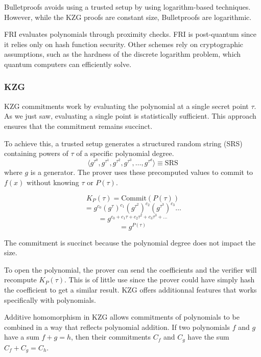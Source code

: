 Bulletproofs avoids using a trusted setup by using logarithm-based techniques\cite{BP18}. 
However, while the KZG proofs are constant size, Bulletproofs are logarithmic.

FRI evaluates polynomials through proximity checks.\cite{FRI} FRI is post-quantum since it relies only on hash function security. 
Other schemes rely on cryptographic assumptions, such as the hardness of the discrete logarithm problem, which quantum computers can efficiently solve.


\subsubsection{KZG}
KZG commitments work by evaluating the polynomial at a single secret point $\tau$. 
As we just saw, evaluating a single point is statistically sufficient.
This approach ensures that the commitment remains succinct.

To achieve this, a trusted setup generates a structured random string (SRS) containing powers of $\tau$
of a specific polynomial degree. 
\[
\langle g^{\tau^0}, g^{\tau^1}, g^{\tau^2}, g^{\tau^3}, \dots, g^{\tau^d} \rangle \equiv \text{SRS}
\]
where \( g \) is a generator.  
The prover uses these precomputed values to commit to \( f(x) \) without knowing \( \tau \) or \( P(\tau) \).

\begin{equation*}
 K_P(\tau) = \text{Commit}(P(\tau))
\end{equation*}
\begin{equation*}
 = g^{c_0} (g^\tau)^{c_1} (g^{\tau^2})^{c_2} (g^{\tau^3})^{c_3} \dots
\end{equation*}
\begin{equation*}
 = g^{c_0 + c_1 \tau + c_2 \tau^2 + c_3 \tau^3 + \dots}
\end{equation*}
\begin{equation*}
 = g^{P(\tau)}
\end{equation*}

The commitment is succinct because the polynomial degree does not impact the size.


To open the polynomial, the prover can send the coefficients and the verifier will recompute $K_P(\tau)$.
This is of little use since the prover could have simply hash the coefficient to get a similar result.
KZG offers additionnal features that works specifically with polynomials.

Additive homomorphism in KZG allows commitments of polynomials to be combined in a way that reflects polynomial addition. 
If two polynomials $f$ and $g$ have a sum $f + g = h$, then their commitments $C_f$ and $C_g$ have the sum $C_f + C_g = C_h$.

